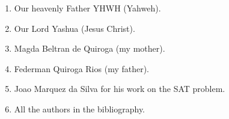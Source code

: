 \documentclass{easychair}
\begin{document}
\begin{enumerate}
\item
Our heavenly Father YHWH (Yahweh).

\item
Our Lord Yashua (Jesus Christ).

\item
Magda Beltran de Quiroga (my mother).

\item
Federman Quiroga Rios (my father).

\item
Joao Marquez da Silva for his work on the SAT problem.

\item
All the authors in the bibliography.

\end{enumerate}

\label{sect:bib}



\end{document}

